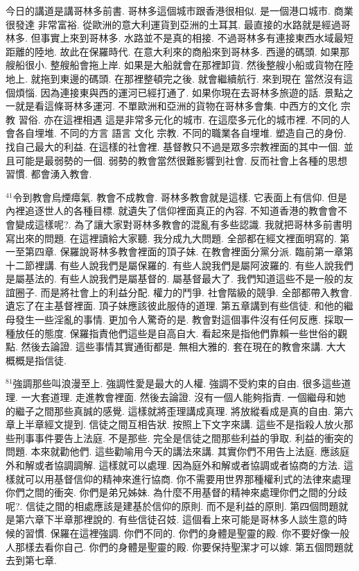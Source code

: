 \documentclass{book}
\begin{document}
今日的講道是講哥林多前書.
哥林多這個城市跟香港很相似.
是一個港口城市.
商業很發達 非常富裕.
從歐洲的意大利運貨到亞洲的土耳其.
最直接的水路就是經過哥林多.
但事實上來到哥林多.
水路並不是真的相接.
不過哥林多有連接東西水域最短距離的陸地.
故此在保羅時代.
在意大利來的商船來到哥林多.
西邊的碼頭.
如果那艘船很小.
整艘船會拖上岸.
如果是大船就會在那裡卸貨.
然後整艘小船或貨物在陸地上.
就拖到東邊的碼頭.
在那裡整頓完之後.
就會繼續航行.
來到現在 當然沒有這個煩惱.
因為連接東與西的運河已經打通了.
如果你現在去哥林多旅遊的話.
景點之一就是看這條哥林多運河.
不單歐洲和亞洲的貨物在哥林多會集.
中西方的文化 宗教 習俗.
亦在這裡相遇 這是非常多元化的城市.
在這麼多元化的城市裡.
不同的人會各自埋堆.
不同的方言 語言 文化 宗教.
不同的職業各自埋堆.
塑造自己的身份.
找自己最大的利益.
在這樣的社會裡.
基督教只不過是眾多宗教裡面的其中一個.
並且可能是最弱勢的一個.
弱勢的教會當然很難影響到社會.
反而社會上各種的思想 習慣.
都會湧入教會.

$^{41}$令到教會烏煙瘴氣.
教會不成教會.
哥林多教會就是這樣.
它表面上有信仰.
但是內裡追逐世人的各種目標.
就遺失了信仰裡面真正的內容.
不知道香港的教會會不會變成這樣呢?.
為了讓大家對哥林多教會的混亂有多些認識.
我就把哥林多前書明寫出來的問題.
在這裡讀給大家聽.
我分成九大問題.
全部都在經文裡面明寫的.
第一至第四章.
保羅說哥林多教會裡面的頂子妹.
在教會裡面分黨分派.
臨前第一章第十二節裡講.
有些人說我們是屬保羅的.
有些人說我們是屬阿波羅的.
有些人說我們是屬基法的.
有些人說我們是屬基督的.
屬基督最大了.
我們知道這些不是一般的友誼圈子.
而是將社會上的利益分配.
權力的鬥爭.
社會階級的競爭.
全部都帶入教會.
遺忘了在主基督裡面.
頂子妹應該彼此服侍的道理.
第五章講到有些信徒.
和他的繼母發生一些淫亂的事情.
更加令人驚奇的是.
教會對這個事件沒有任何反應.
採取一種放任的態度.
保羅指責他們這些是自高自大.
看起來是指他們靠賴一些世俗的觀點.
然後去論證.
這些事情其實通街都是.
無相大雅的.
套在現在的教會來講.
大大概概是指信徒.

$^{81}$強調那些叫浪漫至上.
強調性愛是最大的人權.
強調不受約束的自由.
很多這些道理.
一大套道理.
走進教會裡面.
然後去論證.
沒有一個人能夠指責.
一個繼母和她的繼子之間那些真誠的感覺.
這樣就將歪理講成真理.
將放縱看成是真的自由.
第六章上半章經文提到.
信徒之間互相告狀.
按照上下文字來講.
這些不是指殺人放火那些刑事事件要告上法庭.
不是那些.
完全是信徒之間那些利益的爭取.
利益的衝突的問題.
本來就勸他們.
這些勸喻用今天的講法來講.
其實你們不用告上法庭.
應該庭外和解或者協調調解.
這樣就可以處理.
因為庭外和解或者協調或者協商的方法.
這樣就可以用基督信仰的精神來進行協商.
你不需要用世界那種權利式的法律來處理你們之間的衝突.
你們是弟兄姊妹.
為什麼不用基督的精神來處理你們之間的分歧呢?.
信徒之間的相處應該是建基於信仰的原則.
而不是利益的原則.
第四個問題就是第六章下半章那裡說的.
有些信徒召妓.
這個看上來可能是哥林多人談生意的時候的習慣.
保羅在這裡強調.
你們不同的.
你們的身體是聖靈的殿.
你不要好像一般人那樣去看你自己.
你們的身體是聖靈的殿.
你要保持聖潔才可以嫁.
第五個問題就去到第七章.
\end{document}
